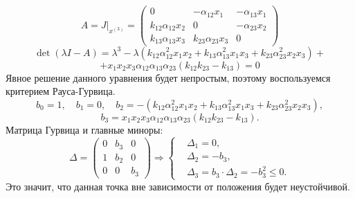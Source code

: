 \begin{enumerate}
            \[
                A = J \big|_{x^{(3)}} = \left(\begin{matrix}
                    0 & -\alpha_{12} x_1 & -\alpha_{13} x_1 \\
                    k_{12} \alpha_{12} x_2 & 0 & -\alpha_{23} x_2 \\
                    k_{13} \alpha_{13} x_3 & k_{23} \alpha_{23} x_3 & 0
                \end{matrix}\right)
            \]
            \[
                \det(\lambda I - A) = \lambda^3 - \lambda (k_{12} \alpha_{12}^2 x_1 x_2 + k_{13} \alpha_{13}^2 x_1 x_3 + k_{23} \alpha_{23}^2 x_2 x_3) +
            \]
            \[
                + x_1 x_2 x_3 \alpha_{12} \alpha_{13} \alpha_{23} (k_{12} k_{23} - k_{13}) = 0
            \]
            Явное решение данного уравнения будет непростым, поэтому воспользуемся критерием Рауса-Гурвица.
            \[
                b_0 = 1, \quad b_1 = 0, \quad b_2 = -(k_{12} \alpha_{12}^2 x_1 x_2 + k_{13} \alpha_{13}^2 x_1 x_3 + k_{23} \alpha_{23}^2 x_2 x_3),
            \]
            \[
                b_3 = x_1 x_2 x_3 \alpha_{12} \alpha_{13} \alpha_{23} (k_{12} k_{23} - k_{13}).
            \]
            Матрица Гурвица и главные миноры:
            \[
                \Delta = \left( \begin{matrix}
                    0 & b_3 & 0 \\
                    1 & b_2 & 0 \\
                    0   & 0 & b_3
                \end{matrix} \right)
                \Rightarrow 
                \left\{ \begin{split}
                    & \Delta_1 = 0, \\
                    & \Delta_2 = -b_3, \\
                    & \Delta_3 = b_3 \cdot \Delta_2 = -b_3^2 \leq 0.
                \end{split} \right.
            \]
            Это значит, что данная точка вне зависимости от положения будет неустойчивой.
    \end{enumerate}